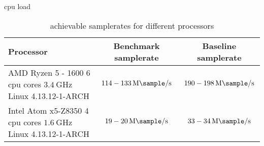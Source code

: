 \begin{subchapter}{\Acrshort{cpu} load}
  \begin{table}[H]
    \centering
    \begin{tabular}{| l | c | c |}
      \hline
      Processor & Benchmark samplerate & Baseline samplerate \\

      \hline
      \parbox[c]{5cm}{\vspace{1mm} AMD Ryzen 5 - 1600 \\ 6 \acrshort{cpu} cores \\ $\SI{3.4}{\giga\hertz}$ \\ Linux 4.13.12-1-ARCH \vspace{1mm}} &
      \parbox[c]{5cm}{\centering $114 - \SI{133}{\mega\sample\per\second}$} &
      \parbox[c]{5cm}{\centering $190 - \SI{198}{\mega\sample\per\second}$} \\

      \hline
      \parbox[c]{5cm}{\vspace{1mm} Intel Atom x5-Z8350 \\ 4 \acrshort{cpu} cores \\ $\SI{1.6}{\giga\hertz}$ \\ Linux 4.13.12-1-ARCH \vspace{1mm}} &
      \parbox[c]{5cm}{\centering $19 - \SI{20}{\mega\sample\per\second}$} &
      \parbox[c]{5cm}{\centering $33 - \SI{34}{\mega\sample\per\second}$} \\

      \hline
    \end{tabular}
    \caption{achievable samplerates for different processors}
    \label{tab:cpuload}
  \end{table}
\end{subchapter}
